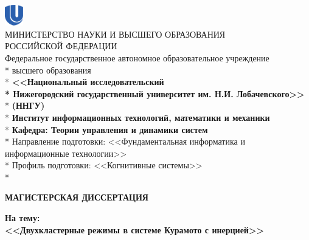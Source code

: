 \begin{titlepage}
	\newpage
	\begin{center}
		\includegraphics[width=0.8cm]{logo_unn_crop.eps} \\
		МИНИСТЕРСТВО  НАУКИ И ВЫСШЕГО ОБРАЗОВАНИЯ \\ 
		РОССИЙСКОЙ  ФЕДЕРАЦИИ  \\
		Федеральное государственное автономное образовательное учреждение\\* высшего образования \\*
		\textbf{<<Национальный исследовательский \\* Нижегородский государственный университет им. Н.И. Лобачевского>>}\\*
		\textbf{(ННГУ)}\\*
		\vspace{2em}
		\textbf{Институт информационных технологий, математики и механики}\\*
		\textbf{Кафедра: Теории управления и динамики систем}\\*
		\vspace{2em}
		Направление подготовки: <<Фундаментальная информатика и информационные технологии>>\\*
		Профиль подготовки: <<Когнитивные системы>>\\*
	\end{center}

	\vspace{1em}

	\begin{center}
		{\Large \textbf{МАГИСТЕРСКАЯ ДИССЕРТАЦИЯ}}
    \end{center}

    \vspace{2.5em}

	\begin{center}
		{\textbf{На тему:}}\\
		
		{\large \textbf{<<Двухкластерные режимы в системе Курамото с инерцией>>}}
	\end{center}

    \vspace{4em}

    \hfill
    \begin{minipage}[t]{.36\linewidth}
    	\begin{flushleft}
    	

\end{flushleft}
\end{minipage}
\end{titlepage}

